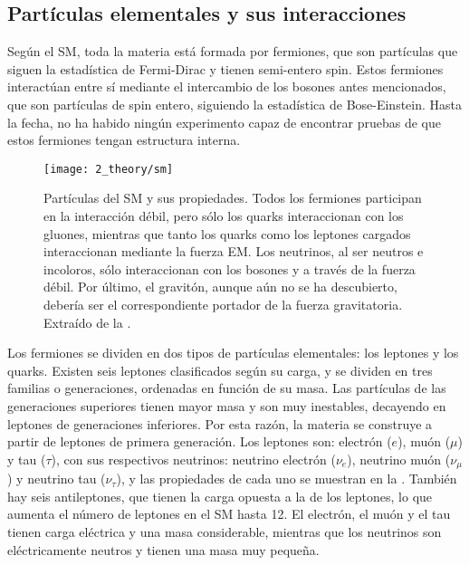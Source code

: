 \subsection{Part\'iculas elementales y sus interacciones}
\label{subsec:theory:sm:particles_interaction}

Según el \ac{SM}, toda la materia está formada por fermiones, que son partículas que siguen la estadística de Fermi-Dirac y tienen semi-entero spin. Estos fermiones interactúan entre sí mediante el intercambio de los bosones antes mencionados, que son partículas de spin entero, siguiendo la estadística de Bose-Einstein. Hasta la fecha, no ha habido ningún experimento capaz de encontrar pruebas de que estos fermiones tengan estructura interna.

\begin{figure}[ht!]
    \centering
    \texttt{[image: 2\_theory/sm]}
    \caption{Part\'iculas del \ac{SM} y sus propiedades. Todos los fermiones participan en la interacción débil, pero sólo los quarks interaccionan con los gluones, mientras que tanto los quarks como los leptones cargados interaccionan mediante la fuerza \ac{EM}. Los neutrinos, al ser neutros e incoloros, sólo interaccionan con los bosones \Wboson y \Zboson a través de la fuerza débil. Por último, el gravitón, aunque aún no se ha descubierto, debería ser el correspondiente portador de la fuerza gravitatoria. Extraído de la .}
    \label{fig:theory:sm:particles_interaction:particles}
\end{figure}

Los fermiones se dividen en dos tipos de partículas elementales: los leptones y los quarks. Existen seis leptones clasificados según su carga, y se dividen en tres familias o generaciones, ordenadas en función de su masa. Las partículas de las generaciones superiores tienen mayor masa y son muy inestables, decayendo en leptones de generaciones inferiores. Por esta razón, la materia se construye a partir de leptones de primera generación. Los leptones son: electrón (\(e\)), muón (\(\mu\)) y tau (\(\tau\)), con sus respectivos neutrinos: neutrino electrón (\(\nu_{e}\)), neutrino muón (\(\nu_{\mu}\)) y neutrino tau (\(\nu_{\tau}\)), y las propiedades de cada uno se muestran en la \Fig{\ref{fig:theory:sm:particles_interaction:particles}}.
También hay seis antileptones, que tienen la carga opuesta a la de los leptones, lo que aumenta el número de leptones en el \ac{SM} hasta 12. El electrón, el muón y el tau tienen carga eléctrica y una masa considerable, mientras que los neutrinos son eléctricamente neutros y tienen una masa muy pequeña.

